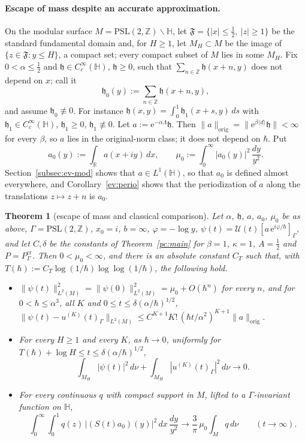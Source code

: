 \documentclass[twoside,10pt]{article}
\numberwithin{equation}{section}
\theoremstyle{slbody}
\newtheorem{theorem}[equation]{Theorem}
\theoremstyle{remark}
\newcommand{\Hb}{\mathbb{H}}
\newcommand{\norm}[1]{\lVert #1\rVert}
\newcommand{\ue}{\mathrm{e}}
\newcommand{\cU}{\mathcal{U}}
\newcommand{\pcNorm}[1]{\norm{#1}_{\mathrm{orig}}}
\begin{document}
\paragraph{Escape of mass despite an accurate approximation.}
On the modular surface $M=\mathrm{PSL}(2,\mathbb Z)\backslash\Hb$, let $\mathfrak F=\{|x|\le\tfrac12,\ |z|\ge1\}$ be the standard fundamental
domain and, for $H\ge1$, let $M_H\subset M$ be the image of $\{z\in\mathfrak F:y\le H\}$, a compact set; every compact subset of $M$ lies in
some $M_H$. Fix $0<\alpha\le\tfrac12$ and $\mathfrak h\in C_c^\infty(\Hb)$, $\mathfrak h\ge0$, such that $\sum_{n\in\mathbb Z}\mathfrak h(x+n,y)$
does not depend on $x$; call it
\[
  \mathfrak h_0(y):=\sum_{n\in\mathbb Z}\mathfrak h(x+n,y),
\]
and assume $\mathfrak h_0\not\equiv0$. For instance $\mathfrak h(x,y)=\int_0^1\mathfrak h_1(x+s,y)\,ds$ with $\mathfrak h_1\in C_c^\infty(\Hb)$,
$\mathfrak h_1\ge0$, $\mathfrak h_1\not\equiv0$. Let $a:=\ue^{-\alpha\Lambda}\mathfrak h$. Then $\pcNorm a=\norm{\ue^{\beta\langle d\rangle}\mathfrak h}<\infty$ for every $\beta$, so
$a$ lies in the original-norm class; it does not depend on $\hbar$. Put
\[
  a_0(y):=\int_{\mathbb R}a(x+iy)\,dx,\qquad\mu_0:=\int_0^\infty|a_0(y)|^2\,\frac{dy}{y^2}.
\]
Section~\ref{subsec:ev-mod} shows that $a\in L^1(\Hb)$, so that $a_0$ is defined almost everywhere, and
Corollary~\ref{ev:perio} shows that the periodization of $a$ along the translations $z\mapsto z+n$ is $a_0$.

\begin{theorem}[escape of mass and classical comparison]\label{ev:mod}\label{cor:escape-intro}
Let $\alpha$, $\mathfrak h$, $a$, $a_0$, $\mu_0$ be as above, $\Gamma=\mathrm{PSL}(2,\mathbb Z)$, $x_0=i$, $b=\infty$, $\varphi=-\log y$,
$\psi(t)=\cU(t)[a\,\ue^{i\varphi/\hbar}]_\Gamma$, and let $C,\delta$ be the constants of Theorem~\ref{pc:main} for $\beta=1$, $\kappa=1$,
$A=\tfrac12$ and $P=P^{\mathrm{cr}}_\Gamma$. Then $0<\mu_0<\infty$, and there is an absolute constant $C_T$ such that, with
$T(\hbar):=C_T\log(1/\hbar)\log\log(1/\hbar)$, the following hold.
\begin{itemize}
\item[(i)] $\norm{\psi(t)}^2_{L^2(M)}=\norm{\psi(0)}^2_{L^2(M)}=\mu_0+O(\hbar^{n})$ for every $n$, and for $0<\hbar\le\alpha^3$, all $K$ and $0\le t\le\delta(\alpha/\hbar)^{1/2}$,
$\norm{\psi(t)-u^{(K)}(t)_\Gamma}_{L^2(M)}\le C^{K+1}K!\,(\hbar t/\alpha^2)^{K+1}\pcNorm a$.
\item[(ii)] For every $H\ge1$ and every $K$, as $\hbar\to0$, uniformly for $T(\hbar)+\log H\le t\le\delta(\alpha/\hbar)^{1/2}$,
\[
  \int_{M_H}|\psi(t)|^2\,d\nu+\int_{M_H}|u^{(K)}(t)_\Gamma|^2\,d\nu\longrightarrow0 .
\]
\item[(iii)] For every continuous $q$ with compact support in $M$, lifted to a $\Gamma$-invariant function on $\Hb$,
\[
  \int_0^\infty\!\!\int_0^1q(z)\,\big|(S(t)a_0)(y)\big|^2\,dx\,\frac{dy}{y^2}\longrightarrow\frac3\pi\,\mu_0\int_Mq\,d\nu\qquad(t\to\infty).
\]
\end{itemize}
\end{theorem}
\end{document}
